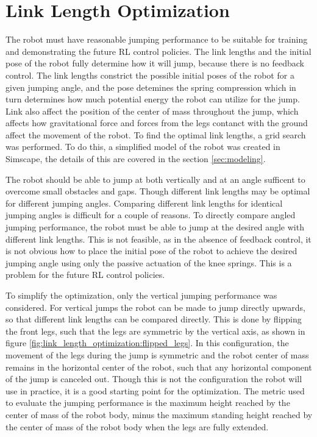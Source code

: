 \section{Link Length Optimization}


The robot must have reasonable jumping performance to be suitable for training and demonstrating the future RL control policies. The link lengths and the initial pose of the robot fully determine how it will jump, because there is no feedback control. The link lengths constrict the possible initial poses of the robot for a given jumping angle, and the pose detemines the spring compression which in turn determines how much potential energy the robot can utilize for the jump. Link also affect the position of the center of mass throughout the jump, which affects how gravitational force and forces from the legs contanct with the ground affect the movement of the robot. To find the optimal link lengths, a grid search was performed. To do this, a simplified model of the robot was created in Simscape, the details of this are covered in the section \ref{sec:modeling}.

The robot should be able to jump at both vertically and at an angle sufficent to overcome small obstacles and gaps. Though different link lengths may be optimal for different jumping angles. Comparing different link lengths for identical jumping angles is difficult for a couple of reasons. To directly compare angled jumping performance, the robot must be able to jump at the desired angle with different link lengths. This is not feasible, as in the absence of feedback control, it is not obvious how to place the initial pose of the robot to achieve the desired jumping angle using only the passive actuation of the knee springs. This is a problem for the future RL control policies. 

To simplify the optimization, only the vertical jumping performance was considered. For vertical jumps the robot can be made to jump directly upwards, so that different link lengths can be compared directly. This is done by flipping the front legs, such that the legs are symmetric by the vertical axis, as shown in figure \ref{fig:link_length_optimization:flipped_legs}. In this configuration, the movement of the legs during the jump is symmetric and the robot center of mass remains in the horizontal center of the robot, such that any horizontal component of the jump is canceled out. Though this is not the configuration the robot will use in practice, it is a good starting point for the optimization. The metric used to evaluate the jumping performance is the maximum height reached by the center of mass of the robot body, minus the maximum standing height reached by the center of mass of the robot body when the legs are fully extended. 

